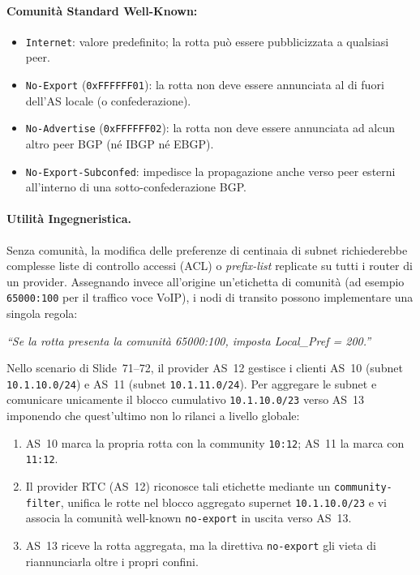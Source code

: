 \documentclass[11pt, a4paper]{article}
\begin{document}
\paragraph{Comunità Standard Well-Known:}
\begin{itemize}[noitemsep]
    \item \texttt{Internet}: valore predefinito; la rotta può essere pubblicizzata a qualsiasi peer.
    \item \texttt{No-Export} (\texttt{0xFFFFFF01}): la rotta non deve essere annunciata al di fuori dell'AS locale (o confederazione).
    \item \texttt{No-Advertise} (\texttt{0xFFFFFF02}): la rotta non deve essere annunciata ad alcun altro peer BGP (né IBGP né EBGP).
    \item \texttt{No-Export-Subconfed}: impedisce la propagazione anche verso peer esterni all'interno di una sotto-confederazione BGP.
\end{itemize}

\paragraph{Utilità Ingegneristica.}
Senza comunità, la modifica delle preferenze di centinaia di subnet richiederebbe complesse liste di controllo accessi (ACL) o \emph{prefix-list} replicate su tutti i router di un provider. Assegnando invece all'origine un'etichetta di comunità (ad esempio \texttt{65000:100} per il traffico voce VoIP), i nodi di transito possono implementare una singola regola:
\begin{center}
\emph{``Se la rotta presenta la comunità 65000:100, imposta Local\_Pref = 200.''}
\end{center}

Nello scenario di Slide~71--72, il provider AS~12 gestisce i clienti AS~10 (subnet \texttt{10.1.10.0/24}) e AS~11 (subnet \texttt{10.1.11.0/24}). Per aggregare le subnet e comunicare unicamente il blocco cumulativo \texttt{10.1.10.0/23} verso AS~13 imponendo che quest'ultimo non lo rilanci a livello globale:
\begin{enumerate}[noitemsep]
    \item AS~10 marca la propria rotta con la community \texttt{10:12}; AS~11 la marca con \texttt{11:12}.
    \item Il provider RTC (AS~12) riconosce tali etichette mediante un \texttt{community-filter}, unifica le rotte nel blocco aggregato supernet \texttt{10.1.10.0/23} e vi associa la comunità well-known \texttt{no-export} in uscita verso AS~13.
    \item AS~13 riceve la rotta aggregata, ma la direttiva \texttt{no-export} gli vieta di riannunciarla oltre i propri confini.

\end{enumerate}
\end{document}
